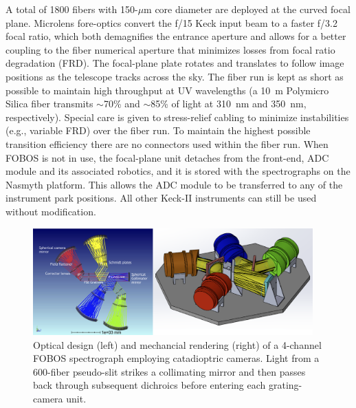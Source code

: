 A total of 1800 fibers with 150-$\mu$m core diameter are deployed at
the curved focal plane. Microlens fore-optics convert the f/15 Keck
input beam to a faster f/3.2 focal ratio, which both demagnifies the
entrance aperture and allows for a better coupling to the fiber
numerical aperture that minimizes losses from focal ratio degradation
(FRD). The focal-plane plate rotates and translates to follow image
positions as the telescope tracks across the sky. The fiber run is
kept as short as possible to maintain high throughput at UV
wavelengths (a 10~m Polymicro Silica fiber transmits $\sim$70\% and
$\sim$85\% of light at 310~nm and 350~nm, respectively). Special care
is given to stress-relief cabling to minimize instabilities (e.g.,
variable FRD) over the fiber run. To maintain the highest possible
transition efficiency there are no connectors used within the fiber
run. When FOBOS is not in use, the focal-plane unit detaches from the
front-end, ADC module and its associated robotics, and it is stored
with the spectrographs on the Nasmyth platform. This allows the ADC
module to be transferred to any of the instrument park positions. All
other Keck-II instruments can still be used without modification.

\begin{figure}[h!]
\vskip -0.1in
\includegraphics[width=0.96\textwidth]{figs/FOBOS_spec_optical-CAD.png}
\caption{\small Optical design (left) and mechancial rendering (right) of a 4-channel FOBOS spectrograph employing catadioptric cameras.
Light from a 600-fiber pseudo-slit strikes a collimating mirror and then
passes back through subsequent dichroics before entering each grating-camera unit.}
\label{fig:spectrograph}
\end{figure}

